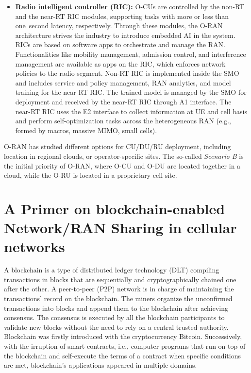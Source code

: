 \documentclass[journal]{IEEEtran}
\begin{document}
\begin{itemize}
		\item \textbf{Radio intelligent controller (RIC):} O-CUs are controlled by the non-RT and the near-RT RIC modules, supporting tasks with more or less than one~second latency, respectively. Through these modules, the {O-RAN} architecture strives the industry to introduce embedded AI in the system. RICs are based on software apps to orchestrate and manage the RAN. Functionalities like mobility management, admission control, and interference management are available as apps on the RIC, which enforces network policies to the radio segment. Non-RT RIC is implemented inside the SMO and includes service and policy management, RAN analytics, and model training for the near-RT RIC. The trained model is managed by the SMO for deployment and received by the near-RT RIC through A1 interface. The near-RT RIC uses the E2 interface to collect information at UE and cell basis and perform self-optimization tasks across the heterogeneous RAN (e.g., formed by macros, massive MIMO, small cells).
	\end{itemize}
	O-RAN has studied different options for CU/DU/RU deployment, including location in regional clouds, or operator-specific sites. The so-called \textit{Scenario B} is the initial priority of {O-RAN}, where O-CU and O-DU are located together in a cloud, while the O-RU is located in a proprietary cell site.
	
	\section{A Primer on blockchain-enabled Network/RAN Sharing in cellular networks}
	\label{section:related_work}
	
	A blockchain is a type of distributed ledger technology (DLT) compiling transactions in blocks that are sequentially and cryptographically chained one after the other. A peer-to-peer (P2P) network is in charge of maintaining the transactions' record on the blockchain. The miners organize the unconfirmed transactions into blocks and append them to the blockchain after achieving consensus. The consensus is executed by all the blockchain participants to validate new blocks without the need to rely on a central trusted authority. Blockchain was firstly introduced with the cryptocurrency Bitcoin. Successively, with the irruption of smart contracts, i.e., computer programs that run on top of the blockchain and self-execute the terms of a contract when specific conditions are met, blockchain's applications appeared in multiple domains.
	
\end{document}
